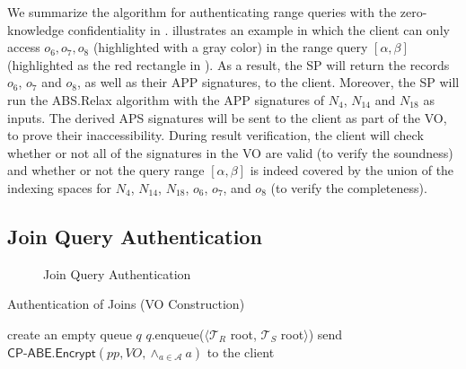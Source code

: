 We summarize the algorithm for authenticating range queries with the zero-knowledge confidentiality in .
 illustrates an example in which the client can only access $o_6, o_7, o_8$ (highlighted with a gray color) in the range query $[\alpha,\beta]$ (highlighted as the red rectangle in ). As a result, the SP will return the records $o_6$, $o_7$ and $o_8$, as well as their APP signatures, to the client. Moreover, the SP will run the \textsf{ABS.Relax} algorithm with the APP signatures of $N_4$, $N_{14}$ and $N_{18}$ as inputs. The derived APS signatures will be sent to the client as part of the VO, to prove their inaccessibility. During result verification, the client will check whether or not all of the signatures in the VO are valid (to verify the soundness) and whether or not the query range $[\alpha, \beta]$ is indeed covered by the union of the indexing spaces for $N_4$, $N_{14}$, $N_{18}$, $o_6$, $o_7$, and $o_8$ (to verify the completeness).

\subsection{Join Query Authentication}

\begin{figure}[t]
  \centering
  \resizebox{.75\linewidth}{!}{}
  \caption{Join Query Authentication}\label{fig:access-control:join}
\end{figure}

\begin{algorithm}[t]
  \caption{Authentication of Joins (VO Construction)}\label{alg:access-control:join-query}
  create an empty queue $q$\;
  $q$.enqueue($\langle \mathcal{T}_R$ root, $\mathcal{T}_S$ root$\rangle$)\; %
  send $\textsf{CP-ABE.Encrypt}(pp, VO, \land_{a \in \mathcal{A}} a)$ to the client\;
\end{algorithm}


